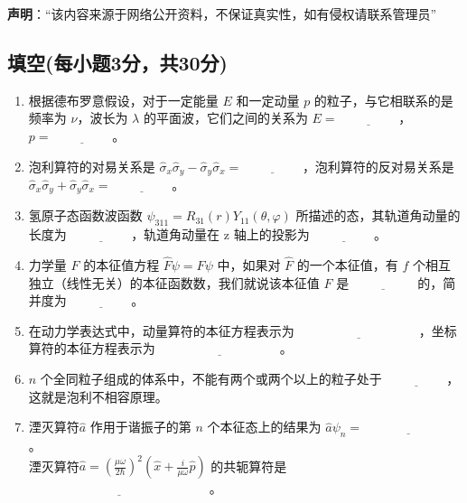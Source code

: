 
\textbf{声明}：“该内容来源于网络公开资料，不保证真实性，如有侵权请联系管理员”

\subsection{填空(每小题3分，共30分)}
\begin{enumerate}
    \item 根据德布罗意假设，对于一定能量 $E$ 和一定动量 $p$ 的粒子，与它相联系的是频率为 $\nu$，波长为 $\lambda$ 的平面波，它们之间的关系为 $E = \underline{\hspace{2cm}}$，$p = \underline{\hspace{2cm}}$。
    
    \item 泡利算符的对易关系是 $\hat \sigma_x \hat \sigma_y - \hat \sigma_y \hat \sigma_x = \underline{\hspace{2cm}}$，泡利算符的反对易关系是 $\hat \sigma_x \hat \sigma_y + \hat \sigma_y \hat \sigma_x = \underline{\hspace{2cm}}$。
    
    \item 氢原子态函数波函数 $\psi_{311} = R_{31}(r) Y_{11}(\theta, \varphi)$ 所描述的态，其轨道角动量的长度为 $\underline{\hspace{2cm}}$，轨道角动量在 z 轴上的投影为 $\underline{\hspace{2cm}}$。
    
    \item 力学量 $F$ 的本征值方程 $\hat F\psi = F\psi$ 中，如果对 $\hat F$ 的一个本征值，有 $f$ 个相互独立（线性无关）的本征函数数，我们就说该本征值 $F$ 是 $\underline{\hspace{2cm}}$ 的，简并度为 $\underline{\hspace{2cm}}$。
    
    \item 在动力学表达式中，动量算符的本征方程表示为 $\underline{\hspace{4cm}}$，坐标算符的本征方程表示为 $\underline{\hspace{4cm}}$。
    
    \item $n$ 个全同粒子组成的体系中，不能有两个或两个以上的粒子处于 $\underline{\hspace{2cm}}$，这就是泡利不相容原理。

    \item 湮灭算符$\hat a$ 作用于谐振子的第 $n$ 个本征态上的结果为 $\hat a\psi_n = \underline{\hspace{3cm}}$。\\
    湮灭算符$\hat a = \left( \frac{\mu \omega}{2\hbar} \right)^{2} \left(\hat x + \frac{i}{\mu \omega} \hat{p} \right)$ 的共轭算符是 $\underline{\hspace{6cm}}$。


\end{enumerate}

